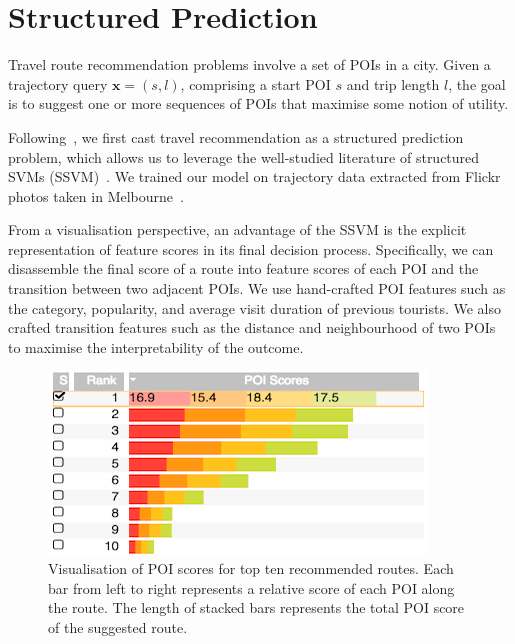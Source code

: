 \section{Structured Prediction}
Travel route recommendation problems involve a set of POIs in a city. 
Given a trajectory query $\mathbf{x} = (s, l)$, comprising a start POI $s$ and trip length $l$, the goal is to suggest one or more sequences of POIs that maximise some notion of utility.

Following~\cite{chen2017SR}, we first cast travel recommendation as a structured prediction problem, which allows us to leverage the well-studied literature of structured SVMs (SSVM)~\cite{tsochantaridis2005large,joachims2009predicting}. 
We trained our model on trajectory data extracted from Flickr photos taken in Melbourne~\cite{chen2016learning}.

From a visualisation perspective, an advantage of the SSVM is the explicit representation of feature scores in its final decision process. Specifically, we can disassemble the final score of a route into feature scores of each POI and the transition between two adjacent POIs. 
We use hand-crafted POI features such as the category, popularity, and average visit duration of previous tourists. We also crafted transition features such as the distance and neighbourhood of two POIs to maximise the interpretability of the outcome.

\begin{figure}[t!]
\includegraphics[width=0.7\linewidth]{figure/sample_stack.png}
\caption{Visualisation of POI scores for top ten recommended routes. Each bar from left to right represents a relative score of each POI along the route.
The length of stacked bars represents the total POI score of the suggested route.}
\label{fig:stack} \vspace{-2em}
\end{figure}
